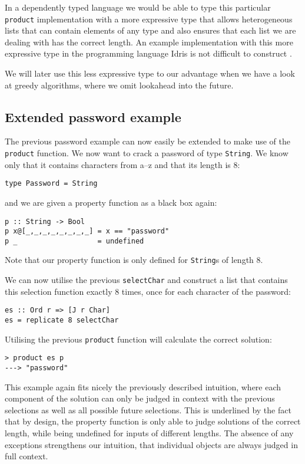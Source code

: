 \documentclass[runningheads]{llncs}
\begin{document}
In a dependently typed language we would be able to type this particular \texttt{product} implementation with a more expressive type that allows heterogeneous lists that can contain elements of any type and also ensures that each list we are dealing with has the correct length. An example implementation with this more expressive type in the programming language Idris is not difficult to construct \cite{hartmann2022dependentBigOtimes}.

We will later use this less expressive type to our advantage when we have a look at greedy algorithms, where we omit lookahead into the future.
%
%
%
\subsection{Extended password example}
The previous password example can now easily be extended to make use of the \texttt{product} function. We now want to crack a password of type \texttt{String}. We know only that it  contains characters from a--z and that its length is 8:
\begin{verbatim}
type Password = String
\end{verbatim}
and we are given a property function as a black box again:
\begin{verbatim}
p :: String -> Bool
p x@[_,_,_,_,_,_,_,_] = x == "password"
p _                   = undefined
\end{verbatim}
Note that our property function is only defined for \texttt{String}s of length 8.

We can now utilise the previous \texttt{selectChar} and construct a list that contains this selection function exactly 8 times, once for each character of the password:
\begin{verbatim}
es :: Ord r => [J r Char]
es = replicate 8 selectChar
\end{verbatim}
Utilising the previous \texttt{product} function will calculate the correct solution:
\begin{verbatim}
> product es p
---> "password"
\end{verbatim}
This example again fits nicely the previously described intuition, where each component of the solution can only be judged in context with the previous selections as well as all possible future selections. This is underlined by the fact that by design, the property function is only able to judge solutions of the correct length, while being undefined for inputs of different lengths. The absence of any exceptions strengthens our intuition, that individual objects are always judged in full context.
%
%
%
\end{document}
